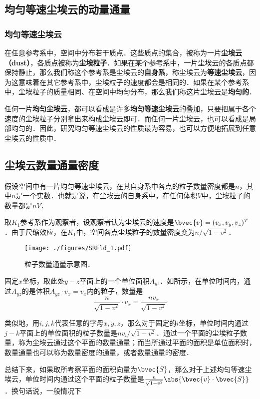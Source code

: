 

\subsection{均匀等速尘埃云的动量通量}

\subsubsection{均匀等速尘埃云}

在任意参考系中，空间中分布若干质点．这些质点的集合，被称为一片\textbf{尘埃云（dust）}，各质点被称为\textbf{尘埃粒子}．如果在某个参考系中，一片尘埃云的各质点都保持静止，那么我们称这个参考系是尘埃云的\textbf{自身系}，称尘埃云为\textbf{等速尘埃云}，因为这意味着在其它参考系中，尘埃粒子的速度都会是相同的．如果在某个参考系中，尘埃粒子的质量相同、在空间中均匀分布，那么我们称这片尘埃云是\textbf{均匀的}．

任何一片\textbf{均匀尘埃云}，都可以看成是许多\textbf{均匀等速尘埃云}的叠加，只要把属于各个速度的尘埃粒子分别拿出来构成尘埃云即可．而任何一片尘埃云，也可以看成是局部均匀的．因此，研究均匀等速尘埃云的性质最为容易，也可以方便地拓展到任意尘埃云的性质中．

\subsection{尘埃云数量通量密度}

假设空间中有一片均匀等速尘埃云，在其自身系中各点的粒子数量密度都是$n$，其中$n$是一个实数．也就是说，在尘埃云的自身系中，在任何体积$V$中，尘埃粒子的数量都是$nV$．

取$K_1$参考系作为观察者，设观察者认为尘埃云的速度是$\bvec{v}=(v_x, v_y, v_z)^T$．由于尺缩效应，在$K_1$中，空间各点尘埃粒子的数量密度变为$n/\sqrt{1-v^2}$．

\begin{figure}[ht]
\centering
\texttt{[image: ./figures/SRFld\_1.pdf]}
\caption{粒子数量通量示意图．} \label{SRFld_fig1}
\end{figure}

固定$x$坐标，取此处$y-z$平面上的一个单位面积$A_{yz}$．如所示，在单位时间内，通过$A_{yz}$的是体积$A_{yz}\cdot v_x=v_x$内的粒子，数量是
\begin{equation}
\frac{n}{\sqrt{1-v^2}}\cdot v_x=\frac{nv_x}{\sqrt{1-v^2}}
\end{equation}

类似地，用$i, j, k$代表任意的字母$x, y, z$，那么对于固定的$i$坐标，单位时间内通过$j-k$平面上的单位面积的粒子数量是$nv_i/\sqrt{1-v^2}$．通过一个平面的尘埃粒子数量，称为尘埃云通过这个平面的数量通量；而当所通过平面的面积是单位面积时，数量通量也可以称为数量密度的通量，或者数量通量的密度．

总结下来，如果取所考察平面的面积向量为$\bvec{S}$，那么对于上述均匀等速尘埃云，单位时间内通过这个平面的粒子数量是$\frac{n}{\sqrt{1-v^2}}\abs{\bvec{v}\cdot\bvec{S}}$．换句话说，一般情况下




